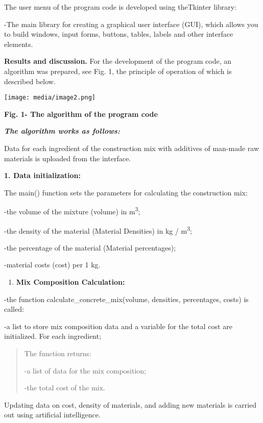 \documentclass[
]{article}
\begin{document}
The user menu of the program code is developed using theTkinter library:

-The main library for creating a graphical user interface (GUI), which
allows you to build windows, input forms, buttons, tables, labels and
other interface elements.

\textbf{Results and discussion.} For the development of the program
code, an algorithm was prepared, see Fig. 1, the principle of operation
of which is described below.

\texttt{[image: media/image2.png]}

\textbf{Fig. 1- The algorithm of the program code}

\emph{\textbf{The algorithm works as follows:}}

Data for each ingredient of the construction mix with additives of
man-made raw materials is uploaded from the interface.

\textbf{1. Data initialization:}

The main() function sets the parameters for calculating the construction
mix:

-the volume of the mixture (volume) in m\textsuperscript{3};

-the density of the material (Material Densities) in kg /
m\textsuperscript{3};

-the percentage of the material (Material percentages);

-material costs (cost) per 1 kg.

\begin{enumerate}
\def\labelenumi{\arabic{enumi}.}
\setcounter{enumi}{1}
\item
  \textbf{Mix Composition Calculation:}
\end{enumerate}

-the function calculate\_concrete\_mix(volume, densities, percentages,
costs) is called:

-a list to store mix composition data and a variable for the total cost
are initialized. For each ingredient;

\begin{quote}
The function returns:

-a list of data for the mix composition;

-the total cost of the mix.
\end{quote}

Updating data on cost, density of materials, and adding new materials is
carried out using artificial intelligence.
\end{document}
